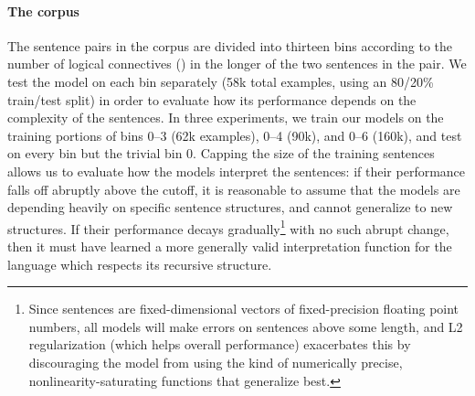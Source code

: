 \paragraph{The corpus}
The sentence pairs in the corpus are divided into thirteen bins according to the number of logical connectives () in the longer of the two sentences in the pair. We test the model on each bin separately (58k total examples, using an 80/20\% train/test split) in order to evaluate how its performance depends on the complexity of the sentences. In three experiments, we train our models on the training portions of bins 0--3 (62k examples), 0--4 (90k), and 0--6 (160k), and test on every bin but the trivial bin 0. Capping the size of the training sentences allows us to evaluate how the models interpret the sentences: if their performance falls off abruptly above the cutoff, it is reasonable to assume that the models are depending heavily on specific sentence structures, and cannot generalize to new structures. If their performance decays gradually\footnote{Since sentences are fixed-dimensional vectors of fixed-precision floating point numbers, all models will make errors on sentences above some length, and L2 regularization (which helps overall performance) exacerbates this by discouraging the model from using the kind of numerically precise, nonlinearity-saturating functions that generalize best.} with no such abrupt change, then it must have learned a more generally valid interpretation function for the language which respects its recursive structure.



